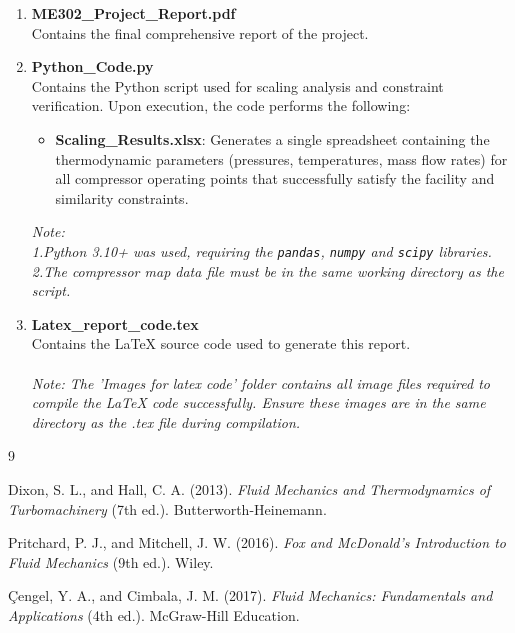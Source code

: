 \documentclass[12pt]{article}
\begin{document}
\begin{enumerate}
    \item \textbf{ME302\_Project\_Report.pdf} \\
    Contains the final comprehensive report of the project.
    
    \item \textbf{Python\_Code.py} \\
    Contains the Python script used for scaling analysis and constraint verification. Upon execution, the code performs the following:
    \begin{itemize}
        \item \textbf{Scaling\_Results.xlsx}: Generates a single spreadsheet containing the thermodynamic parameters (pressures, temperatures, mass flow rates) for all compressor operating points that successfully satisfy the facility and similarity constraints.
        
    \end{itemize}
    \textit{Note:}
    \\
    \textit{ 1.Python 3.10+ was used, requiring the \texttt{pandas}, \texttt{numpy} and \texttt{scipy}  libraries. }
    \\
    \textit{2.The compressor map data file must be in the same working directory as the script.}

    \item \textbf{Latex\_report\_code.tex} \\
    Contains the LaTeX source code used to generate this report.
    \\
    \\
    \textit{Note: The 'Images for latex code' folder contains all image files required to compile the LaTeX code successfully. Ensure these images are in the same directory as the .tex file during compilation.}
\end{enumerate}


\begin{thebibliography}{9}

Dixon, S. L., and Hall, C. A. (2013). \textit{Fluid Mechanics and Thermodynamics of Turbomachinery} (7th ed.). Butterworth-Heinemann.

Pritchard, P. J., and Mitchell, J. W. (2016). \textit{Fox and McDonald's Introduction to Fluid Mechanics} (9th ed.). Wiley.

Çengel, Y. A., and Cimbala, J. M. (2017). \textit{Fluid Mechanics: Fundamentals and Applications} (4th ed.). McGraw-Hill Education.

\end{thebibliography}
\end{document}
